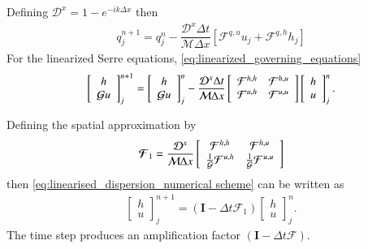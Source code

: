 \documentclass[preprint,sort&compress,1p]{article}
\begin{document}
Defining $\mathcal{D}^x = 1 - e^{-ik\Delta x}$ then
\begin{align}
q_j^{n+1}  = q_j^n   - \dfrac{\mathcal{D}^x \Delta t}{\mathcal{M}\Delta x} \left[ \mathcal{F}^{q,u}u_j + \mathcal{F}^{q,h}h_j \right]
\end{align}
For the linearized Serre equations, \eqref{eq:linearized_governing_equations}
\begin{align}
\label{eq:linearised_dispersion_numerical scheme}
\left[\begin{array}{c}
h \\ \mathcal{G}u
\end{array}\right]^{n+1}_j = \left[\begin{array}{c}
h \\ \mathcal{G}u
\end{array}\right]^{n}_j - \frac{\mathcal{D}^x\Delta t}{\mathcal{M}\Delta x}\left[\begin{array}{c c}
\mathcal{F}^{h,h} & \mathcal{F}^{h,u} \\ \mathcal{F}^{u,h} & \mathcal{F}^{u,u}
\end{array}\right]\left[\begin{array}{c}
h \\ u
\end{array}\right]^{n}_j.
\end{align}

Defining the spatial approximation by
\begin{align}
\label{eq:mathcal_F_matrix}
\boldsymbol{\mathcal{F}}_1 = \frac{\mathcal{D}^x}{\mathcal{M}\Delta x}\left[\begin{array}{c c}
\mathcal{F}^{h,h} & \mathcal{F}^{h,u} \\ \frac{1}{\mathcal{G}}\mathcal{F}^{u,h} &  \frac{1}{\mathcal{G}}\mathcal{F}^{u,u}
\end{array}\right]
\end{align}
then \eqref{eq:linearised_dispersion_numerical scheme} can be written as
\begin{align}
\label{eq:frequency_analysis_first-order}
\left[\begin{array}{c}
h \\ u
\end{array}\right]^{n+1}_j = \left(\boldsymbol{I} - \Delta t\boldsymbol{\mathcal{F}}_1 \right)\left[\begin{array}{c}
h \\ u
\end{array}\right]^{n}_j.
\end{align}
The time step produces an amplification factor $\left(\boldsymbol{I} - \Delta t\boldsymbol{\mathcal{F}} \right)$.
\end{document}
